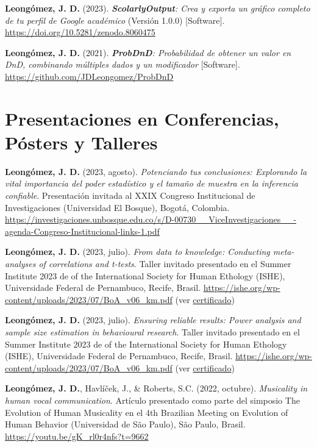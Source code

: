 \documentclass[11pt,a4paper,]{awesome-cv}
\begin{document}
\textbf{Leongómez, J. D.} (2023). \emph{\textbf{ScolarlyOutput}: Crea y
exporta un gráfico completo de tu perfil de Google académico} (Versión
1.0.0) {[}Software{]}.
\href{https://github.com/JDLeongomez/ScholarlyOutput_ES}{https://doi.org/10.5281/zenodo.8060475}

\textbf{Leongómez, J. D.} (2021). \emph{\textbf{ProbDnD}: Probabilidad
de obtener un valor en DnD, combinando múltiples dados y un modificador}
{[}Software{]}. \url{https://github.com/JDLeongomez/ProbDnD}

\endgroup

\section{Presentaciones en Conferencias, Pósters y
Talleres}\label{presentaciones-en-conferencias-puxf3sters-y-talleres}

\begingroup
\footnotesize
\setlength{\parindent}{-0.5in}
\setlength{\leftskip}{0.5in}

\textbf{Leongómez, J. D.} (2023, agosto). \emph{Potenciando tus
conclusiones: Explorando la vital importancia del poder estadístico y el
tamaño de muestra en la inferencia confiable}. Presentación invitada al
XXIX Congreso Institucional de Investigaciones (Universidad El Bosque),
Bogotá, Colombia.
\url{https://investigaciones.unbosque.edu.co/s/D-00730__ViceInvestigaciones__-agenda-Congreso-Institucional-links-1.pdf}

\textbf{Leongómez, J. D.} (2023, julio). \emph{From data to knowledge:
Conducting meta-analyses of correlations and t-tests}. Taller invitado
presentado en el Summer Institute 2023 de of the International Society
for Human Ethology (ISHE), Universidade Federal de Pernambuco, Recife,
Brasil. \url{https://ishe.org/wp-content/uploads/2023/07/BoA_v06_km.pdf}
(ver
\href{https://jdleongomez.info/es/files/Cert_ISHE_2023.pdf}{certificado})

\textbf{Leongómez, J. D.} (2023, julio). \emph{Ensuring reliable
results: Power analysis and sample size estimation in behavioural
research}. Taller invitado presentado en el Summer Institute 2023 de of
the International Society for Human Ethology (ISHE), Universidade
Federal de Pernambuco, Recife, Brasil.
\url{https://ishe.org/wp-content/uploads/2023/07/BoA_v06_km.pdf} (ver
\href{https://jdleongomez.info/es/files/Cert_ISHE_2023.pdf}{certificado})

\textbf{Leongómez, J. D.}, Havlíček, J., \& Roberts, S.C. (2022,
octubre). \emph{Musicality in human vocal communication}. Artículo
presentado como parte del simposio The Evolution of Human Musicality en
el 4th Brazilian Meeting on Evolution of Human Behavior (Universidad de
São Paulo), São Paulo, Brasil. \url{https://youtu.be/gK_rl0r4nfs?t=9662}
\end{document}
